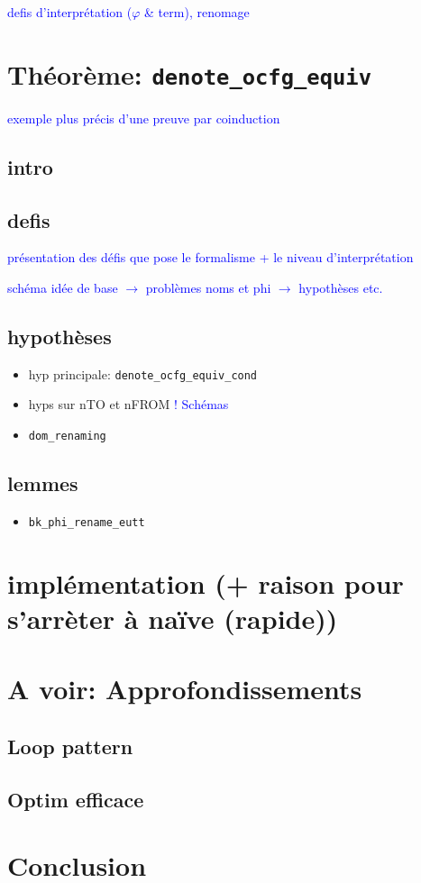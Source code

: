 \documentclass[11pt]{article}
\newcommand{\leon}[1]{\textcolor{blue}{#1}}
\begin{document}
\leon{defis d'interprétation ($\varphi$ \& term), renomage}

\section{Théorème: \texttt{denote\_ocfg\_equiv}}
\label{sec:equiv}

\leon{exemple plus précis d'une preuve par coinduction}

\subsection*{intro}

\subsection{defis}

\leon{présentation des défis que pose le formalisme + le niveau d'interprétation}

\leon{schéma idée de base $\rightarrow$ problèmes noms et phi $\rightarrow$ hypothèses etc.}

\subsection{hypothèses}

\begin{itemize}
  \item hyp principale: \texttt{denote\_ocfg\_equiv\_cond}
  \item hyps sur nTO et nFROM \leon{! Schémas}
  \item \texttt{dom\_renaming}
\end{itemize}

\subsection{lemmes}

\begin{itemize}
  \item \texttt{bk\_phi\_rename\_eutt}
\end{itemize}

\section{implémentation (+ raison pour s'arrèter à naïve (rapide))}

\section{A voir: Approfondissements}
\label{sec:appr}

\subsection{Loop pattern}

\subsection{Optim efficace}

\section*{Conclusion}
\label{sec:ccl}
\end{document}
